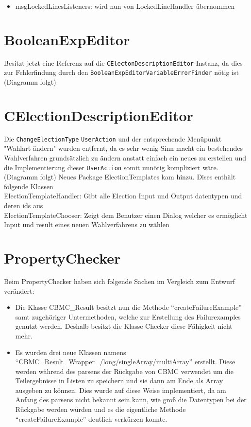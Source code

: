 \documentclass[a4paper]{scrreprt}
\begin{document}
\begin{itemize}
\item msgLockedLinesListeners: wird nun von LockedLineHandler übernommen
\end{itemize}

\section{BooleanExpEditor}
Besitzt jetzt eine Referenz auf die \verb!CElectonDescriptionEditor!-Instanz, da dies zur Fehlerfindung durch den \verb!BooleanExpEditorVariableErrorFinder! nötig ist
\newline
(Diagramm folgt)
\newline

\section{CElectionDescriptionEditor}

Die \verb!ChangeElectionType! \verb!UserAction! und der entsprechende Menüpunkt "Wahlart ändern" wurden entfernt, da es sehr wenig Sinn macht ein bestehendes Wahlverfahren grundsätzlich zu ändern anstatt einfach ein neues zu erstellen und die Implementierung dieser \verb!UserAction! somit unnötig kompliziert wäre.
\newline
(Diagramm folgt)
\newline
Neues Package ElectionTemplates kam hinzu. Dises enthält folgende Klassen\\
ElectionTemplateHandler: Gibt alle Election Input und Output datentypen und deren ids aus\\
ElectionTemplateChooser: Zeigt dem Benutzer einen Dialog welcher es ermöglicht Input und result eines neuen Wahlverfahrens zu wählen

\section{PropertyChecker}
Beim PropertyChecker haben sich folgende Sachen im Vergleich zum Entwurf
verändert:
\begin{itemize}
\item Die Klasse CBMC\_Result besitzt nun die Methode ``createFailureExample''
  samt zugehöriger Untermethoden, welche zur Erstellung des Failurexamples
  genutzt werden. Deshalb besitzt die Klasse Checker diese Fähigkeit nicht mehr.

\item Es wurden drei neue Klassen namens
``CBMC\_Result\_Wrapper\_/long/singleArray/multiArray'' erstellt. Diese werden
während des parsens der Rückgabe von CBMC verwendet um die Teilergebnisse in
Listen zu speichern und sie dann am Ende als Array ausgeben zu können. Dies
wurde auf diese Weise implementiert, da am Anfang des parsens nicht bekannt
sein kann, wie groß die Datentypen bei der Rückgabe werden würden und es die
eigentliche Methode ``createFailureExample'' deutlich verkürzen konnte.

\end{itemize}
\end{document}
